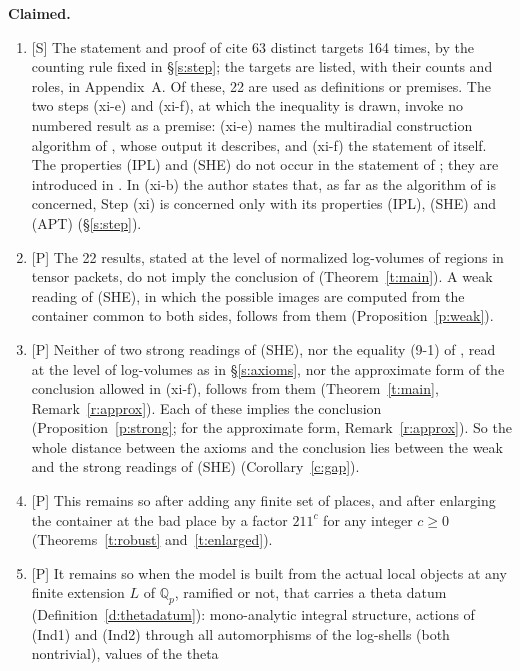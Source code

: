 \documentclass[11pt]{article}
\theoremstyle{plain}
\theoremstyle{definition}
\theoremstyle{remark}
\newcommand{\Smark}{\textup{[S]}}
\newcommand{\Pmark}{\textup{[P]}}
\newcommand{\Qp}[1]{\mathbb Q_{#1}}
\begin{document}
\smallskip\noindent\textbf{Claimed.}
\begin{enumerate}[label=(\roman*),leftmargin=2.2em]
\item \Smark{} The statement and proof of \cite[Cor.~3.12]{IUT3} cite 63 distinct targets
  164 times, by the counting rule fixed in \S\ref{s:step}; the targets are listed, with
  their counts and roles, in Appendix~A.
  Of these, 22 are used as definitions or premises. The two steps (xi-e) and (xi-f), at
  which the inequality is drawn, invoke no numbered result as a premise: (xi-e) names the
  multiradial construction algorithm of \cite[Thm.~3.11]{IUT3}, whose output it describes,
  and (xi-f) the statement of \cite[Cor.~3.12]{IUT3} itself. The properties (IPL) and (SHE)
  do not occur in the statement of \cite[Thm.~3.11]{IUT3}; they are introduced in
  \cite[Rem.~3.11.1(iii)]{IUT3}. In (xi-b) the author states that, as far as the algorithm
  of \cite[Thm.~3.11]{IUT3} is concerned, Step (xi) is concerned only with its properties
  (IPL), (SHE) and (APT) (\S\ref{s:step}).
\item \Pmark{} The 22 results, stated at the level of normalized log-volumes of regions
  in tensor packets, do not imply the conclusion of \cite[Cor.~3.12]{IUT3}
  (Theorem~\ref{t:main}). A weak reading of (SHE), in which the possible images are
  computed from the container common to both sides, follows from them
  (Proposition~\ref{p:weak}).
\item \Pmark{} Neither of two strong readings of (SHE), nor the equality (9-1) of
  \cite[\S9.2]{LANA}, read at the level of log-volumes as in \S\ref{s:axioms}, nor the
  approximate form of the conclusion allowed in (xi-f),
  follows from them (Theorem~\ref{t:main}, Remark~\ref{r:approx}).
  Each of these implies the conclusion (Proposition~\ref{p:strong}; for the approximate
  form, Remark~\ref{r:approx}). So the whole distance between the axioms and the conclusion
  lies between the weak and the strong readings of (SHE) (Corollary~\ref{c:gap}).
\item \Pmark{} This remains so after adding any finite set of places, and after
  enlarging the container at the bad place by a factor $211^{c}$ for any integer $c\ge0$
  (Theorems~\ref{t:robust} and~\ref{t:enlarged}).
\item \Pmark{} It remains so when the model is built from the actual local objects at any
  finite extension $L$ of $\Qp p$, ramified or not, that carries a theta datum
  (Definition~\ref{d:thetadatum}): mono-analytic integral structure, actions of (Ind1) and
  (Ind2) through all automorphisms of the log-shells (both nontrivial), values of the theta

\end{enumerate}
\end{document}
